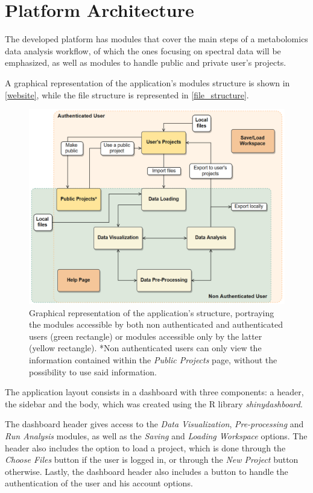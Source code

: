 
\section{Platform Architecture}

The developed platform has modules that cover the main steps of a metabolomics data analysis workflow, of which the ones focusing on spectral data will be emphasized, as well as modules to handle public and private user's projects. 

A graphical representation of the application's modules structure is shown in \autoref{website}, while the file structure is represented in \autoref{file_structure}.

\begin{figure}[H]
	\centering
	\includegraphics[width=1\linewidth]{Imagens/website_2}
	\caption{Graphical representation of the application's structure, portraying the modules accessible by both non authenticated and authenticated users (green rectangle) or modules accessible only by the latter (yellow rectangle). *Non authenticated users can only view the information contained within the \textit{Public Projects} page, without the possibility to use said information.}
	\label{website}
\end{figure}


The application layout consists in a dashboard with three components: a header, the sidebar and the body, which was created using the R library \textit{shinydashboard}. 

The dashboard header gives access to the \textit{Data Visualization}, \textit{Pre-processing} and \textit{Run Analysis} modules, as well as the \textit{Saving} and \textit{Loading Workspace} options. The header also includes the option to load a project, which is done through the \textit{Choose Files} button if the user is logged in, or through the \textit{New Project} button otherwise. Lastly, the dashboard header also includes a button to handle the authentication of the user and his account options. 


